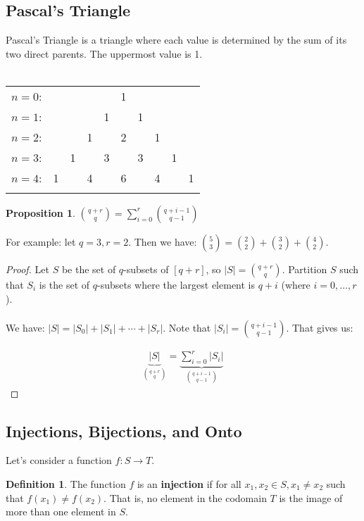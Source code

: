 \documentclass[]{article}
\newtheorem*{proposition}{Proposition}
\theoremstyle{definition}
\newtheorem*{defn}{Definition}
\newcommand{\lecture}[1]{\marginpar{{\footnotesize $\leftarrow$ \underline{#1}}}}
\begin{document}
			\subsection{Pascal's Triangle}
				Pascal's Triangle is a triangle where each value is determined by the sum of its two direct parents. The uppermost value is 1.
				\\ \\
				\begin{center}
					\begin{tabular}{rccccccccc}
						$n = 0$:&    &    &    &    &  1\\\noalign{\smallskip\smallskip}
						$n = 1$:&    &    &    &  1 &    &  1\\\noalign{\smallskip\smallskip}
						$n = 2$:&    &    &  1 &    &  2 &    &  1\\\noalign{\smallskip\smallskip}
						$n = 3$:&    &  1 &    &  3 &    &  3 &    &  1\\\noalign{\smallskip\smallskip}
						$n = 4$:&  1 &    &  4 &    &  6 &    &  4 &    &  1\\\noalign{\smallskip\smallskip}
					\end{tabular}
				\end{center}

				\begin{proposition}
					$\displaystyle \binom{q + r}{q} = \sum_{i = 0}^{r} \binom{q + i - 1}{q - 1}$
				\end{proposition}

				For example: let $q = 3, r = 2$. Then we have: $\displaystyle \binom{5}{3} = \binom{2}{2} + \binom{3}{2} + \binom{4}{2}$.

				\begin{proof}
					Let $S$ be the set of $q$-subsets of $[q + r]$, so $|S| = \binom{q + r}{q}$. Partition $S$ such that $S_i$ is the set of $q$-subsets where the largest element is $q + i$ (where $i = 0, \ldots, r$).
					\\ \\
					We have: $|S| = |S_0| + |S_1| + \cdots + |S_r|$. Note that $|S_i| = \binom{q + i - 1}{q - 1}$. That gives us:

					\begin{align*}
						\underbrace{|S|}_{\binom{q + r}{q}} = \underbrace{\sum_{i = 0}^{r} |S_i|}_{\binom{q + i - 1}{q - 1}}
					\end{align*}
				\end{proof}

		\subsection{Injections, Bijections, and Onto} \lecture{January 11, 2013}
			Let's consider a function $f: S \to T$.
			\begin{defn}
				The function $f$ is an \textbf{injection} if for all $x_1, x_2 \in S, x_1 \ne x_2$ such that $f(x_1) \ne f(x_2)$. That is, no element in the codomain $T$ is the image of more than one element in $S$.
			\end{defn}
\end{document}
